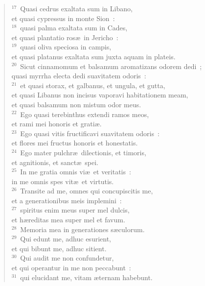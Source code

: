 \begin{flushleft}\begin{verse}${}^{17}$~Quasi cedrus exaltata sum in Libano,\\ et quasi cypressus in monte Sion~:\\
${}^{18}$~quasi palma exaltata sum in Cades,\\ et quasi plantatio ros\ae\ in Jericho~:\\
${}^{19}$~quasi oliva speciosa in campis,\\ et quasi platanus exaltata sum juxta aquam in plateis.\\
${}^{20}$~Sicut cinnamomum et balsamum aromatizans odorem dedi~;\\ quasi myrrha electa dedi suavitatem odoris~:\\
${}^{21}$~et quasi storax, et galbanus, et ungula, et gutta,\\ et quasi Libanus non incisus vaporavi habitationem meam,\\ et quasi balsamum non mistum odor meus.\\
${}^{22}$~Ego quasi terebinthus extendi ramos meos,\\ et rami mei honoris et grati\ae .\\
${}^{23}$~Ego quasi vitis fructificavi suavitatem odoris~:\\ et flores mei fructus honoris et honestatis.\\
${}^{24}$~Ego mater pulchr\ae\ dilectionis, et timoris,\\ et agnitionis, et sanct\ae\ spei.\\
${}^{25}$~In me gratia omnis vi\ae\ et veritatis~:\\ in me omnis spes vit\ae\ et virtutis.\\
${}^{26}$~Transite ad me, omnes qui concupiscitis me,\\ et a generationibus meis implemini~:\\
${}^{27}$~spiritus enim meus super mel dulcis,\\ et h\ae reditas mea super mel et favum.\\
${}^{28}$~Memoria mea in generationes s\ae culorum.\\
${}^{29}$~Qui edunt me, adhuc esurient,\\ et qui bibunt me, adhuc sitient.\\
${}^{30}$~Qui audit me non confundetur,\\ et qui operantur in me non peccabunt~:\\
${}^{31}$~qui elucidant me, vitam \ae ternam habebunt.\end{verse}\end{flushleft}


